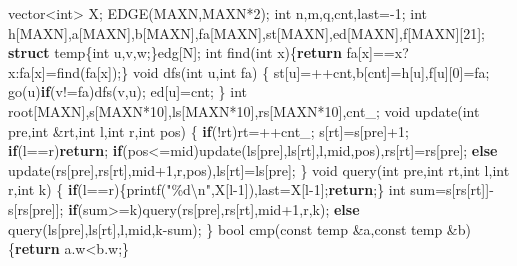 \documentclass[
]{article}
\newenvironment{Shaded}{}{}
\newcommand{\AttributeTok}[1]{\textcolor[rgb]{0.49,0.56,0.16}{#1}}
\newcommand{\ControlFlowTok}[1]{\textcolor[rgb]{0.00,0.44,0.13}{\textbf{#1}}}
\newcommand{\DataTypeTok}[1]{\textcolor[rgb]{0.56,0.13,0.00}{#1}}
\newcommand{\DecValTok}[1]{\textcolor[rgb]{0.25,0.63,0.44}{#1}}
\newcommand{\KeywordTok}[1]{\textcolor[rgb]{0.00,0.44,0.13}{\textbf{#1}}}
\newcommand{\NormalTok}[1]{#1}
\newcommand{\SpecialCharTok}[1]{\textcolor[rgb]{0.25,0.44,0.63}{#1}}
\newcommand{\StringTok}[1]{\textcolor[rgb]{0.25,0.44,0.63}{#1}}
\newcommand{\VariableTok}[1]{\textcolor[rgb]{0.10,0.09,0.49}{#1}}
\begin{document}
\begin{Shaded}
\begin{Highlighting}[]
\NormalTok{vector\textless{}}\DataTypeTok{int}\NormalTok{\textgreater{} X;}
\NormalTok{EDGE(MAXN,MAXN*}\DecValTok{2}\NormalTok{);}
\DataTypeTok{int}\NormalTok{ n,m,q,cnt,last={-}}\DecValTok{1}\NormalTok{;}
\DataTypeTok{int}\NormalTok{ h[MAXN],a[MAXN],b[MAXN],fa[MAXN],st[MAXN],ed[MAXN],f[MAXN][}\DecValTok{21}\NormalTok{];}
\KeywordTok{struct}\NormalTok{ temp\{}\DataTypeTok{int}\NormalTok{ u,v,w;\}edg[N];}
\DataTypeTok{int}\NormalTok{ find(}\DataTypeTok{int}\NormalTok{ x)\{}\ControlFlowTok{return}\NormalTok{ fa[x]==x?x:fa[x]=find(fa[x]);\}}
\DataTypeTok{void}\NormalTok{ dfs(}\DataTypeTok{int}\NormalTok{ u,}\DataTypeTok{int}\NormalTok{ fa)}
\NormalTok{\{}
\NormalTok{    st[u]=++cnt,b[cnt]=h[u],f[u][}\DecValTok{0}\NormalTok{]=fa;}
\NormalTok{    go(u)}\ControlFlowTok{if}\NormalTok{(v!=fa)dfs(v,u);}
\NormalTok{    ed[u]=cnt;}
\NormalTok{\}}
\DataTypeTok{int}\NormalTok{ root[MAXN],s[MAXN*}\DecValTok{10}\NormalTok{],ls[MAXN*}\DecValTok{10}\NormalTok{],rs[MAXN*}\DecValTok{10}\NormalTok{],}\VariableTok{cnt\_}\NormalTok{;}
\DataTypeTok{void}\NormalTok{ update(}\DataTypeTok{int}\NormalTok{ pre,}\DataTypeTok{int}\NormalTok{ \&rt,}\DataTypeTok{int}\NormalTok{ l,}\DataTypeTok{int}\NormalTok{ r,}\DataTypeTok{int}\NormalTok{ pos)}
\NormalTok{\{}
    \ControlFlowTok{if}\NormalTok{(!rt)rt=++}\VariableTok{cnt\_}\NormalTok{; s[rt]=s[pre]+}\DecValTok{1}\NormalTok{; }\ControlFlowTok{if}\NormalTok{(l==r)}\ControlFlowTok{return}\NormalTok{;}
    \ControlFlowTok{if}\NormalTok{(pos\textless{}=mid)update(ls[pre],ls[rt],l,mid,pos),rs[rt]=rs[pre];}
    \ControlFlowTok{else}\NormalTok{ update(rs[pre],rs[rt],mid+}\DecValTok{1}\NormalTok{,r,pos),ls[rt]=ls[pre];}
\NormalTok{\}}
\DataTypeTok{void}\NormalTok{ query(}\DataTypeTok{int}\NormalTok{ pre,}\DataTypeTok{int}\NormalTok{ rt,}\DataTypeTok{int}\NormalTok{ l,}\DataTypeTok{int}\NormalTok{ r,}\DataTypeTok{int}\NormalTok{ k)}
\NormalTok{\{}
    \ControlFlowTok{if}\NormalTok{(l==r)\{printf(}\StringTok{"}\SpecialCharTok{\%d\textbackslash{}n}\StringTok{"}\NormalTok{,X[l{-}}\DecValTok{1}\NormalTok{]),last=X[l{-}}\DecValTok{1}\NormalTok{];}\ControlFlowTok{return}\NormalTok{;\}}
    \DataTypeTok{int}\NormalTok{ sum=s[rs[rt]]{-}s[rs[pre]];}
    \ControlFlowTok{if}\NormalTok{(sum\textgreater{}=k)query(rs[pre],rs[rt],mid+}\DecValTok{1}\NormalTok{,r,k);}
    \ControlFlowTok{else}\NormalTok{ query(ls[pre],ls[rt],l,mid,k{-}sum);}
\NormalTok{\}}
\DataTypeTok{bool}\NormalTok{ cmp(}\AttributeTok{const}\NormalTok{ temp \&a,}\AttributeTok{const}\NormalTok{ temp \&b)\{}\ControlFlowTok{return}\NormalTok{ a.w\textless{}b.w;\}}

\end{Highlighting}
\end{Shaded}
\end{document}
